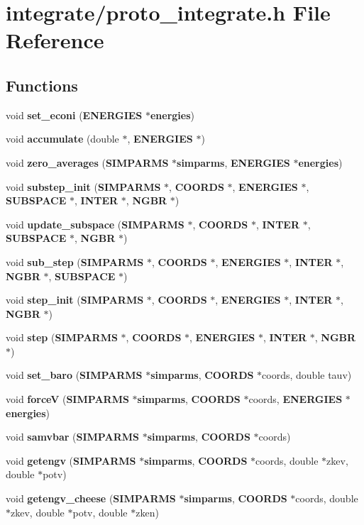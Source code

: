\section{integrate/proto\_\-integrate.h File Reference}
\label{proto__integrate_8h}
\subsection*{Functions}
\begin{CompactItemize}
\item 
void {\bf set\_\-econi} ({\bf ENERGIES} $\ast${\bf energies})
\item 
void {\bf accumulate} (double $\ast$, {\bf ENERGIES} $\ast$)
\item 
void {\bf zero\_\-averages} ({\bf SIMPARMS} $\ast${\bf simparms}, {\bf ENERGIES} $\ast${\bf energies})
\item 
void {\bf substep\_\-init} ({\bf SIMPARMS} $\ast$, {\bf COORDS} $\ast$, {\bf ENERGIES} $\ast$, {\bf SUBSPACE} $\ast$, {\bf INTER} $\ast$, {\bf NGBR} $\ast$)
\item 
void {\bf update\_\-subspace} ({\bf SIMPARMS} $\ast$, {\bf COORDS} $\ast$, {\bf INTER} $\ast$, {\bf SUBSPACE} $\ast$, {\bf NGBR} $\ast$)
\item 
void {\bf sub\_\-step} ({\bf SIMPARMS} $\ast$, {\bf COORDS} $\ast$, {\bf ENERGIES} $\ast$, {\bf INTER} $\ast$, {\bf NGBR} $\ast$, {\bf SUBSPACE} $\ast$)
\item 
void {\bf step\_\-init} ({\bf SIMPARMS} $\ast$, {\bf COORDS} $\ast$, {\bf ENERGIES} $\ast$, {\bf INTER} $\ast$, {\bf NGBR} $\ast$)
\item 
void {\bf step} ({\bf SIMPARMS} $\ast$, {\bf COORDS} $\ast$, {\bf ENERGIES} $\ast$, {\bf INTER} $\ast$, {\bf NGBR} $\ast$)
\item 
void {\bf set\_\-baro} ({\bf SIMPARMS} $\ast${\bf simparms}, {\bf COORDS} $\ast$coords, double tauv)
\item 
void {\bf force\-V} ({\bf SIMPARMS} $\ast${\bf simparms}, {\bf COORDS} $\ast$coords, {\bf ENERGIES} $\ast${\bf energies})
\item 
void {\bf samvbar} ({\bf SIMPARMS} $\ast${\bf simparms}, {\bf COORDS} $\ast$coords)
\item 
void {\bf getengv} ({\bf SIMPARMS} $\ast${\bf simparms}, {\bf COORDS} $\ast$coords, double $\ast$zkev, double $\ast$potv)
\item 
void {\bf getengv\_\-cheese} ({\bf SIMPARMS} $\ast${\bf simparms}, {\bf COORDS} $\ast$coords, double $\ast$zkev, double $\ast$potv, double $\ast$zken)

\end{CompactItemize}
